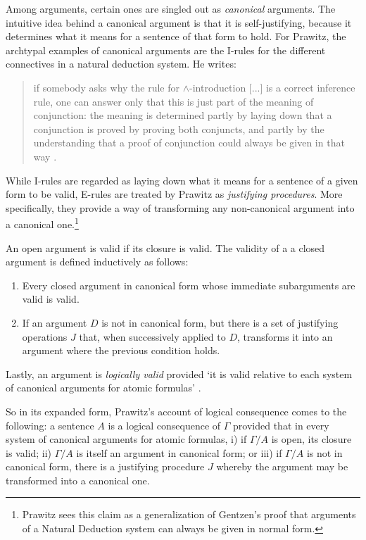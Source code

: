 \documentclass[]{article}
\begin{document}
Among arguments, certain ones are singled out as \textit{canonical} arguments. The intuitive idea behind a canonical argument is that it is self-justifying, because it determines what it means for a sentence of that form to hold. For Prawitz, the archtypal examples of canonical arguments are the I-rules for the different connectives in a natural deduction system. He writes:
\begin{quote}
if somebody asks why the rule for $\wedge$-introduction [...] is a correct inference rule, one can answer only that this is just part of the meaning of conjunction: the meaning is determined partly by laying down that a conjunction is proved by proving both conjuncts, and partly by the understanding that a proof of conjunction could always be given in that way \cite[163]{Prawitz1985}. 
\end{quote}
While I-rules are regarded as laying down what it means for a sentence of a given form to be valid, E-rules are treated by Prawitz as \textit{justifying procedures}. More specifically, they provide a way of transforming any non-canonical argument into a canonical one.\footnote{Prawitz sees this claim as a generalization of Gentzen's proof that arguments of a Natural Deduction system can always be given in normal form.}

An open argument is valid if its closure is valid. The validity of a a closed argument is defined inductively as follows: 
\begin{enumerate}
\item Every closed argument in canonical form whose immediate subarguments are valid is valid.
\item If an argument $D$ is not in canonical form, but there is a set of justifying operations $J$ that, when successively applied to $D$, transforms it into an argument where the previous condition holds.
\end{enumerate}

Lastly, an argument is \textit{logically valid} provided `it is valid relative to each system of canonical arguments for atomic formulas' \cite[165]{Prawitz1985}.

So in its expanded form, Prawitz's account of logical consequence comes to the following: a sentence $A$ is a logical consequence of $\Gamma$ provided that in every system of canonical arguments for atomic formulas, i) if $\Gamma / A$ is open, its closure is valid; ii) $\Gamma / A$ is itself an argument in canonical form; or iii) if $\Gamma / A$ is not in canonical form, there is a justifying procedure $J$ whereby the argument may be transformed into a canonical one.
\end{document}
